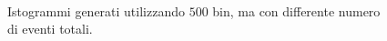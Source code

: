 \begin{figure}
	\label{fig:Breit-Wigner_BINS}
\end{figure}

\begin{figure}
	\centering
	\caption{Istogrammi generati utilizzando $500$ bin, ma con differente numero di eventi totali.}
	 \\
	\label{fig:Breit-WIgner_N}
\end{figure}

\newpage

